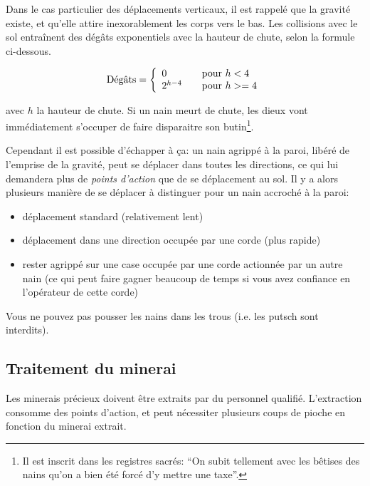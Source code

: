   Dans le cas particulier des déplacements verticaux, il est rappelé que la
  gravité existe, et qu'elle attire inexorablement les corps vers le bas. Les
  collisions avec le sol entraînent des dégâts exponentiels avec la hauteur de
  chute, selon la formule ci-dessous.

  \[
    \text{Dégâts} =
    \left\{
      \begin{array}{l l}
        0         & \quad \text{pour $h < 4$}  \\
        2^{h-4} & \quad \text{pour $h >= 4$} \\
      \end{array}
    \right.
  \]

  avec $h$ la hauteur de chute. Si un nain meurt de chute, les dieux vont
  immédiatement s'occuper de faire disparaitre son butin\footnote{Il est
  inscrit dans les registres sacrés:  ``On subit tellement avec les bêtises
  des nains qu'on a bien été forcé d'y mettre une taxe''.}.

  Cependant il est possible d'échapper à ça: un nain agrippé à la paroi, libéré
  de l'emprise de la gravité, peut se déplacer dans toutes les directions, ce
  qui lui demandera plus de \textit{points d'action} que de se déplacement au
  sol. Il y a alors plusieurs manière de se déplacer à distinguer pour un nain
  accroché à la paroi:

  \begin{itemize}
    \item déplacement standard (relativement lent)
    \item déplacement dans une direction occupée par une corde (plus rapide)
    \item rester agrippé sur une case occupée par une corde actionnée par un
      autre nain (ce qui peut faire gagner beaucoup de temps si vous avez
      confiance en l'opérateur de cette corde)
  \end{itemize}

  Vous ne pouvez pas pousser les nains dans les trous (i.e. les putsch sont
  interdits).

\subsection{Traitement du minerai}

  Les minerais précieux doivent être extraits par du personnel qualifié.
  L'extraction consomme des points d'action, et peut nécessiter plusieurs coups
  de pioche en fonction du minerai extrait.

